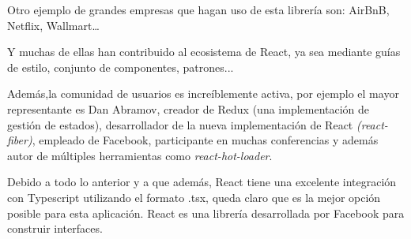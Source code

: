 \bigskip
Otro ejemplo de grandes empresas que hagan uso de esta librería son: AirBnB, Netflix, Wallmart… 

\bigskip
Y muchas de ellas han contribuido al ecosistema de React, ya sea mediante guías de estilo, conjunto de componentes, patrones...

\bigskip
Además,la comunidad de usuarios es increíblemente activa, por ejemplo el mayor representante es Dan Abramov, 
creador de Redux (una implementación de gestión de estados), desarrollador de la nueva implementación de 
React \textit{(react-fiber)}, empleado de Facebook, participante en muchas conferencias y además autor de 
múltiples herramientas como \textit{react-hot-loader}. 

\bigskip
Debido a todo lo anterior y a que además, React tiene una excelente integración con Typescript utilizando 
el formato .tsx, queda claro que es la mejor opción posible para esta aplicación. React es una librería 
desarrollada por Facebook para construir interfaces.

